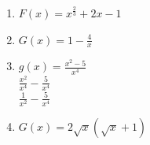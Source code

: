 \begin{example}
  \hfill
  \begin{enumerate}
  \item $F(x) = x^\frac{2}{3} + 2x - 1$
  \item $G(x) = 1 - \frac{4}{x}$
  \item $g(x) = \frac{x^2 - 5}{x^4}$ \\
    $\frac{x^2}{x^4} - \frac{5}{x^4}$ \\
    $\frac{1}{x^2} - \frac{5}{x^4}$
  \item $G(x) = 2\sqrt{x}(\sqrt{x} + 1)$
  \end{enumerate}
\end{example}

